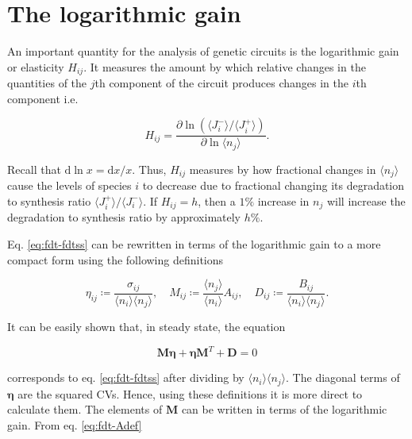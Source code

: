 \section{The logarithmic gain}
\label{sec:log_gain}
An important quantity for the analysis of genetic circuits is the logarithmic gain or elasticity $H_{ij}$. It measures the amount by which relative changes in the quantities of the $j$th component of the circuit produces changes in the $i$th component i.e.

\begin{equation}
  \label{eq:fdt-def_H}
  H_{ij} = \frac{\partial \ln (\langle J_i^-\rangle/\langle J_i^+\rangle)}{\partial \ln \langle n_j\rangle}.
\end{equation}

Recall that $\mathrm{d}\ln x = \mathrm{d}x/x$. Thus, $H_{ij}$ measures by how fractional changes in $\langle n_j\rangle$ cause the levels of species $i$ to decrease due to fractional changing its degradation to synthesis ratio $\langle J_i^+\rangle/\langle J_i^-\rangle$. If $H_{ij} = h$, then a $1\%$ increase in $n_j$ will increase the degradation to synthesis ratio by approximately $h\%$.

Eq. \eqref{eq:fdt-fdtss} can be rewritten in terms of the logarithmic gain to a more compact form using the following definitions

\begin{equation*}
  \eta_{ij}\coloneqq\frac{\sigma_{ij}}{\langle n_i\rangle\langle n_j\rangle}, \quad M_{ij}\coloneqq\frac{\langle n_j\rangle}{\langle n_i\rangle}A_{ij}, \quad D_{ij}\coloneqq\frac{B_{ij}}{\langle n_i\rangle\langle n_j\rangle}.
\end{equation*}

It can be easily shown that, in steady state, the equation

\begin{equation}
  \label{eq:fdt-fdtss2}
  \mathbf{M\eta}+\mathbf{\eta M}^T+\mathbf{D}=0
\end{equation}

corresponds to eq. \eqref{eq:fdt-fdtss} after dividing by $\langle n_i\rangle\langle n_j\rangle$. The diagonal terms of $\mathbf{\eta}$ are the squared CVs. Hence, using these definitions it is more direct to calculate them. The elements of $\mathbf{M}$ can be written in terms of the logarithmic gain. From eq. \eqref{eq:fdt-Adef}

